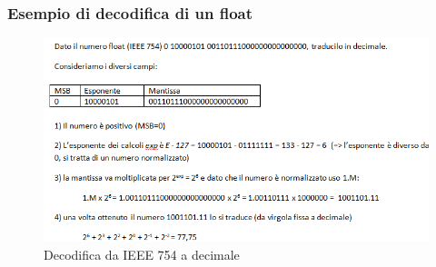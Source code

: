 \documentclass[class=book, crop=false]{standalone}
\begin{document}
\subsubsection{Esempio di decodifica di un float}
\begin{figure}[H]
	\centering
	\includegraphics[width=1.2\textwidth,keepaspectratio]{traduzione-float-to-decimal.png}
	\caption{Decodifica da IEEE 754 a decimale}
\end{figure}
\end{document}

